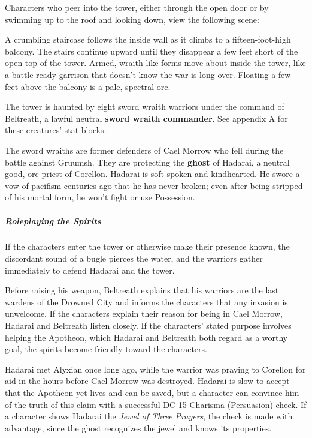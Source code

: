 \documentclass[10pt,a4paper,twoside,bg=print,twocolumn,openany,nodeprecatedcode]{dndbook}
\begin{document}
Characters who peer into the tower, either through the open door or by swimming up to the roof and looking down, view the following scene:

\begin{DndReadAloud}{}
A crumbling staircase follows the inside wall as it climbs to a fifteen-foot-high balcony. The stairs continue upward until they disappear a few feet short of the open top of the tower. Armed, wraith-like forms move about inside the tower, like a battle-ready garrison that doesn't know the war is long over. Floating a few feet above the balcony is a pale, spectral orc.

\end{DndReadAloud}

The tower is haunted by eight sword wraith warriors under the command of Beltreath, a lawful neutral \textbf{sword wraith commander}. See appendix A for these creatures' stat blocks.

The sword wraiths are former defenders of Cael Morrow who fell during the battle against Gruumsh. They are protecting the \textbf{ghost} of Hadarai, a neutral good, orc priest of Corellon. Hadarai is soft-spoken and kindhearted. He swore a vow of pacifism centuries ago that he has never broken; even after being stripped of his mortal form, he won't fight or use Possession.

\subparagraph{Roleplaying the Spirits}
If the characters enter the tower or otherwise make their presence known, the discordant sound of a bugle pierces the water, and the warriors gather immediately to defend Hadarai and the tower.

Before raising his weapon, Beltreath explains that his warriors are the last wardens of the Drowned City and informs the characters that any invasion is unwelcome. If the characters explain their reason for being in Cael Morrow, Hadarai and Beltreath listen closely. If the characters' stated purpose involves helping the Apotheon, which Hadarai and Beltreath both regard as a worthy goal, the spirits become friendly toward the characters.

Hadarai met Alyxian once long ago, while the warrior was praying to Corellon for aid in the hours before Cael Morrow was destroyed. Hadarai is slow to accept that the Apotheon yet lives and can be saved, but a character can convince him of the truth of this claim with a successful DC 15 Charisma (Persuasion) check. If a character shows Hadarai the \textit{Jewel of Three Prayers}, the check is made with advantage, since the ghost recognizes the jewel and knows its properties.
\end{document}
